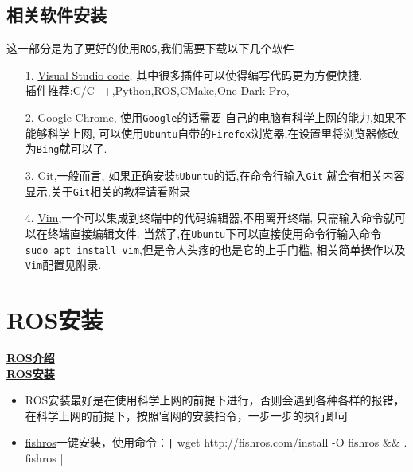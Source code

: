 \documentclass{article}
\newcommand\bash[1]{\texttt| #1 |}
\begin{document}
\subsection{相关软件安装}
这一部分是为了更好的使用\texttt{ROS},我们需要下载以下几个软件
\begin{itemize}
    \item [1.]\href{https://code.visualstudio.com/download}{Visual Studio code},
          其中很多插件可以使得编写代码更为方便快捷.\\插件推荐:C/C++,Python,ROS,CMake,One Dark Pro,
    \item [2.]\href{https://www.google.com/chrome/}{Google Chrome},
          使用\texttt{Google}的话需要
          自己的电脑有科学上网的能力,如果不能够科学上网,
          可以使用\texttt{Ubuntu}自带的\texttt{Firefox}浏览器,在设置里将浏览器修改为\texttt{Bing}就可以了.
    \item [3.]\href{https://git-scm.com/downloads}{Git},一般而言,
          如果正确安装t\texttt{Ubuntu}的话,在命令行输入\texttt{Git}
          就会有相关内容显示,关于\texttt{Git}相关的教程请看附录
    \item [4.]\href{https://www.vim.org/download.php}{Vim},一个可以集成到终端中的代码编辑器,不用离开终端,
          只需输入命令就可以在终端直接编辑文件.
          当然了,在\texttt{Ubuntu}下可以直接使用命令行输入命令
          \texttt{sudo apt install vim},但是令人头疼的也是它的上手门槛,
          相关简单操作以及\texttt{Vim}配置见附录.
\end{itemize}

\section{ROS安装}


\href{URLhttps://wiki.ros.org/ROS/Introduction}{\textbf{ROS介绍}}
\\

\href{https://wiki.ros.org/noetic/Installation/Ubuntu}{\textbf{ROS安装}}
\begin{itemize}
    \item ROS安装最好是在使用科学上网的前提下进行，否则会遇到各种各样的报错，在科学上网的前提下，按照官网的安装指令，一步一步的执行即可
    \item \href{https://fishros.org.cn/forum/topic/20/%E5%B0%8F%E9%B1%BC%E7%9A%84%E4%B8%80%E9%94%AE%E5%AE%89%E8%A3%85%E7%B3%BB%E5%88%97?lang=en-US}{fishros}一键安装，使用命令：\bash{wget http://fishros.com/install -O fishros && . fishros}
\end{itemize}
\end{document}
